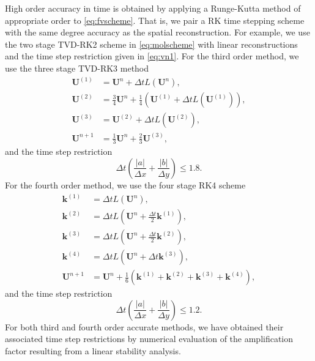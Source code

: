 High order accuracy in time is obtained by applying a Runge-Kutta method of appropriate order to \eqref{eq:fvscheme}.  
That is, we pair a RK time stepping scheme with the same degree accuracy as the spatial reconstruction.  For example, we use the two stage TVD-RK2 scheme in \eqref{eq:molscheme} with linear reconstructions and the time step restriction given in \eqref{eq:vn1}.
For the third order method, we use the three stage TVD-RK3 method
\begin{equation}\label{eq:molscheme_ho2}
\begin{aligned}
\mathbf{U}^{(1)} &= \mathbf{U}^{n} + \Delta t L(\mathbf{U}^n), \\
\mathbf{U}^{(2)} &=  \frac{3}{4}\mathbf{U}^{n} + \frac{1}{4}(\mathbf{U}^{(1)} + \Delta t L(\mathbf{U}^{(1)})), \\
\mathbf{U}^{(3)} &= \mathbf{U}^{(2)} + \Delta t L(\mathbf{U}^{(2)}),  \\
\mathbf{U}^{n+1} &= \frac{1}{3}\mathbf{U}^{n} + \frac{2}{3}\mathbf{U}^{(3)}  ,	
\end{aligned}
\end{equation}
and the time step restriction
\begin{equation}
\Delta t \left( \frac{|a|}{\Delta x} + \frac{|b|}{\Delta y} \right) \leq 1.8.
\end{equation}
For the fourth order method, we use the four stage RK4 scheme
\begin{equation}\label{eq:molscheme_ho4}
\begin{aligned}
\mathbf{k}^{(1)} &= \Delta t L(\mathbf{U}^n), \\
\mathbf{k}^{(2)} &= \Delta t L \left(\mathbf{U}^n + \frac{\Delta t}{2} \mathbf{k}^{(1)} \right), \\	
\mathbf{k}^{(3)} &= \Delta t L \left(\mathbf{U}^n + \frac{\Delta t}{2} \mathbf{k}^{(2)} \right), \\	
\mathbf{k}^{(4)} &= \Delta t L \left(\mathbf{U}^n + \Delta t \mathbf{k}^{(3)} \right), \\	
\mathbf{U}^{n+1} &=\mathbf{U}^n + \frac{1}{6}(\mathbf{k}^{(1)} + \mathbf{k}^{(2)}+ \mathbf{k}^{(3)}+ \mathbf{k}^{(4)}),
\end{aligned}
\end{equation}
and the time step restriction
\begin{equation}
\Delta t \left( \frac{|a|}{\Delta x} + \frac{|b|}{\Delta y} \right) \leq 1.2.
\end{equation}
For both third and fourth order accurate methods, we have obtained their associated time step restrictions by numerical evaluation of the amplification factor resulting from a linear stability analysis.
